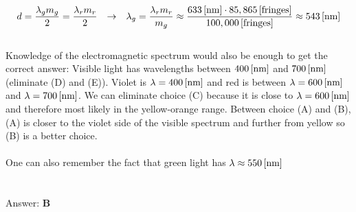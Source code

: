 \documentclass{article}
\begin{document}
\begin{gather}
d = \frac{\lambda_{g} m_{g}}{2} = \frac{\lambda_{r} m_{r}}{2} \hspace{.1in} \rightarrow \hspace{.1in} \lambda_{g}  = \frac{\lambda_{r} m_{r}}{m_{g}} \approx \frac{\unit[633]{[nm]} \cdot \unit[85,865]{[fringes]}}{\unit[100,000]{[fringes]}} \approx \unit[543]{[nm]}
\end{gather}
\\
Knowledge of the electromagnetic spectrum would also be enough to get the correct answer: Visible light has wavelengths between $\unit[400]{[nm]}$ and $\unit[700]{[nm]}$ (eliminate (D) and (E)). Violet is $\lambda = \unit[400]{[nm]}$ and red is between $\lambda = \unit[600]{[nm]}$ and $\lambda = \unit[700]{[nm]}$. We can eliminate choice (C) because it is close to $\lambda = \unit[600]{[nm]}$ and therefore most likely in the yellow-orange range. Between choice (A) and (B), (A) is closer to the violet side of the visible spectrum and further from yellow so (B) is a better choice.\\
\\
One can also remember the fact that green light has $\lambda \approx \unit[550]{[nm]}$\\
\\\\
Answer: \textbf{\textcolor{ProcessBlue}B}\\
\end{document}
